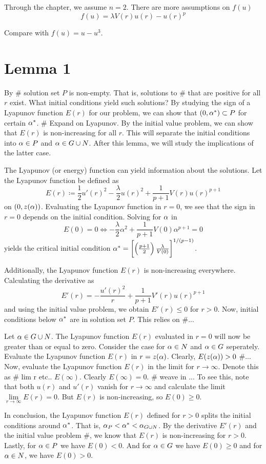 Through the chapter, we assume $n=2$. There are more assumptions on $f(u)$
\[ f(u) = \lambda V(r)u(r) - u(r)^p \]

{\red Compare with $f(u)=u-u^3$}.

\section{Lemma 1}
By \# solution set $P$ is non-empty. That is, solutions to \# that are positive
for all $r$ exist. What initial conditions yield such solutions? By studying
the sign of a Lyapunov function $E(r)$ for our problem, we can show that
$(0,\alpha^*)\subset P$ for certain $\alpha^*$. \# Expand on Lyapunov. By the initial
value problem, we can show that $E(r)$ is non-increasing for all $r$. This will
separate the initial conditions into $\alpha\in P$ and $\alpha\in G\cup N$. After this
lemma, we will study the implications of the latter case.

The Lyapunov (or energy) function can yield information about the solutions.
Let the Lyapunov function be defined as
$$E(r)\coloneqq\frac{1}{2}u'(r)^2-\frac{\lambda}{2}u(r)^2+\frac{1}{p+1}V(r)u(r)^{p+1}$$
on $(0,z(\alpha))$. Evaluating the Lyapunov function in $r=0$, we see that the sign
in $r=0$ depends on the initial condition. Solving for $\alpha$ in
$$E(0)=0\iff-\frac{\lambda}{2}\alpha^2+\frac{1}{p+1}V(0)\alpha^{p+1}=0$$ yields
the critical initial condition
$\alpha^*=\left[\left(\frac{p+1}{2}\right)\frac{\lambda}{V(0)} \right]^{1/(p-1)}$. 

Additionally, the Lyapunov function $E(r)$ is non-increasing everywhere.
Calculating the derivative as
$$E'(r)=-\frac{u'(r)^2}{r}+\frac{1}{p+1}V'(r)u(r)^{p+1}$$ and using the initial
value problem, we obtain $E'(r)\leq0$ for $r>0$. Now, initial conditions below
$\alpha^*$ are in solution set $P$. This relies on \#...  

Let $\alpha\in G\cup N$. The Lyapunov function $E(r)$ evaluated in $r=0$ will now
be greater than or equal to zero. Consider the case for $\alpha\in N$ and $\alpha\in G$
seperately. Evaluate the Lyapunov function $E(r)$ in $r=z(\alpha)$. Clearly,
$E(z(\alpha))>0$ \#... Now, evaluate the Lyapunov function $E(r)$ in the limit for
$r\to\infty$. Denote this as \# lim r etc.. $E(\infty)$. Clearly $E(\infty)=0$.
\# weave in ... To see this, note that both $u(r)$ and $u'(r)$ vanish for
$r\to\infty$ and calculate the limit $\underset{r\to\infty}{\lim}E(r)=0$. But
$E(r)$ is non-increasing, so $E(0)\geq0$.

In conclusion, the Lyapunov function $E(r)$ defined for $r>0$ splits the
initial conditions around $\alpha^*$. That is, $\alpha_P<\alpha^*<\alpha_{G\cup N}$. By the
derivative $E'(r)$ and the initial value problem \#, we know that $E(r)$ is
non-increasing for $r>0$. Lastly, for $\alpha\in P$ we have $E(0)<0$. And for
$\alpha\in G$ we have $E(0)\geq0$ and for $\alpha\in N$, we have $E(0)>0$.

